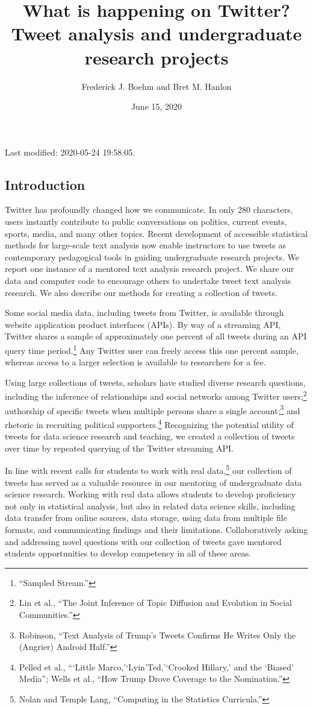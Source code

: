\documentclass[
]{article}
\title{What is happening on Twitter? Tweet analysis and undergraduate research
projects}
\author{Frederick J. Boehm and Bret M. Hanlon}
\date{June 15, 2020}
\begin{document}
\maketitle

Last modified: 2020-05-24 19:58:05.

\hypertarget{introduction}{%
\subsection{Introduction}\label{introduction}}

Twitter has profoundly changed how we communicate. In only 280
characters, users instantly contribute to public conversations on
politics, current events, sports, media, and many other topics. Recent
development of accessible statistical methods for large-scale text
analysis now enable instructors to use tweets as contemporary
pedagogical tools in guiding undergraduate research projects. We report
one instance of a mentored text analysis research project. We share our
data and computer code to encourage others to undertake tweet text
analysis research. We also describe our methods for creating a
collection of tweets.

Some social media data, including tweets from Twitter, is available
through website application product interfaces (APIs). By way of a
streaming API, Twitter shares a sample of approximately one percent of
all tweets during an API query time period.\footnote{``Sampled Stream.''}
Any Twitter user can freely access this one percent sample, whereas
access to a larger selection is available to researchers for a fee.

Using large collections of tweets, scholars have studied diverse
research questions, including the inference of relationships and social
networks among Twitter users;\footnote{Lin et al., ``The Joint Inference
  of Topic Diffusion and Evolution in Social Communities.''} authorship
of specific tweets when multiple persons share a single
account;\footnote{Robinson, ``Text Analysis of Trump's Tweets Confirms
  He Writes Only the (Angrier) Android Half.''} and rhetoric in
recruiting political supporters.\footnote{Pelled et al., ```Little
  Marco,'`Lyin'Ted,'`Crooked Hillary,' and the `Biased' Media''; Wells
  et al., ``How Trump Drove Coverage to the Nomination.''} Recognizing
the potential utility of tweets for data science research and teaching,
we created a collection of tweets over time by repeated querying of the
Twitter streaming API.

In line with recent calls for students to work with real data,\footnote{Nolan
  and Temple Lang, ``Computing in the Statistics Curricula.''} our
collection of tweets has served as a valuable resource in our mentoring
of undergraduate data science research. Working with real data allows
students to develop proficiency not only in statistical analysis, but
also in related data science skills, including data transfer from online
sources, data storage, using data from multiple file formats, and
communicating findings and their limitations. Collaboratively asking and
addressing novel questions with our collection of tweets gave mentored
students opportunities to develop competency in all of these areas.
\end{document}
